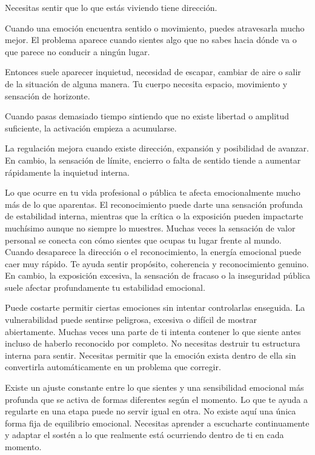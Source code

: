 \documentclass[11pt,a4paper]{article}
\begin{document}
Necesitas sentir que lo que estás viviendo tiene dirección.

Cuando una emoción encuentra sentido o movimiento, puedes atravesarla mucho mejor. El problema aparece cuando sientes algo que no sabes hacia dónde va o que parece no conducir a ningún lugar.

Entonces suele aparecer inquietud, necesidad de escapar, cambiar de aire o salir de la situación de alguna manera. Tu cuerpo necesita espacio, movimiento y sensación de horizonte.

Cuando pasas demasiado tiempo sintiendo que no existe libertad o amplitud suficiente, la activación empieza a acumularse.

La regulación mejora cuando existe dirección, expansión y posibilidad de avanzar. En cambio, la sensación de límite, encierro o falta de sentido tiende a aumentar rápidamente la inquietud interna.

Lo que ocurre en tu vida profesional o pública te afecta emocionalmente mucho más de lo que aparentas. El reconocimiento puede darte una sensación profunda de estabilidad interna, mientras que la crítica o la exposición pueden impactarte muchísimo aunque no siempre lo muestres. Muchas veces la sensación de valor personal se conecta con cómo sientes que ocupas tu lugar frente al mundo. Cuando desaparece la dirección o el reconocimiento, la energía emocional puede caer muy rápido. Te ayuda sentir propósito, coherencia y reconocimiento genuino. En cambio, la exposición excesiva, la sensación de fracaso o la inseguridad pública suele afectar profundamente tu estabilidad emocional.

Puede costarte permitir ciertas emociones sin intentar controlarlas enseguida. La vulnerabilidad puede sentirse peligrosa, excesiva o difícil de mostrar abiertamente. Muchas veces una parte de ti intenta contener lo que siente antes incluso de haberlo reconocido por completo. No necesitas destruir tu estructura interna para sentir. Necesitas permitir que la emoción exista dentro de ella sin convertirla automáticamente en un problema que corregir.

Existe un ajuste constante entre lo que sientes y una sensibilidad emocional más profunda que se activa de formas diferentes según el momento. Lo que te ayuda a regularte en una etapa puede no servir igual en otra. No existe aquí una única forma fija de equilibrio emocional. Necesitas aprender a escucharte continuamente y adaptar el sostén a lo que realmente está ocurriendo dentro de ti en cada momento.
\end{document}
